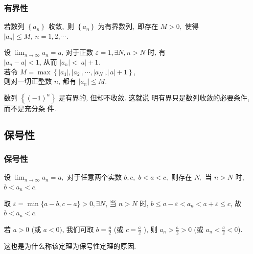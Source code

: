 \documentclass[mathserif]{beamer}
\begin{document}
\begin{frame}
\frametitle{有界性}
	\begin{thm}
		\suojin 若数列 $\left\{a_n\right\}$ 收敛,\ 则 $\left\{a_n\right\}$ 为有界数列,\ 即存在 $M>0$,\ 使得 $\left|a_n\right| \leq M,\ n=1,2, \cdots$.
		\end{thm}
	\pause 
	\begin{proofs}
		\suojin 设 $\lim _{n \rightarrow \infty} a_n=a$, 对于正数 $\varepsilon=1, \exists N, n>N$ 时, 有\\ $\left|a_n-a\right|<1$, 从而 $|a_n|<|a|+1$.\\
	\suojin 若令 $M=\max \left\{\left|a_1\right|,\left|a_2\right|, \cdots,\left|a_N\right|,|a|+1\right\}$,\\
	则对一切正整数 $n$, 都有 $\left|a_n\right| \leq M$.
    \end{proofs}
    \pause 
	\begin{alertblock}{}
			\suojin {} 数列 $\left\{(-1)^n\right\}$ 是有界的, 但却不收敛. 这就说 明有界只是数列收敛的必要条件, 而不是充分条 件.
		\end{alertblock}
\end{frame}




\subsection{保号性}

\begin{frame}
\frametitle{保号性}
	\begin{thm}
		\suojin 设 $\lim _{n \rightarrow \infty} a_n=a$,\ 对于任意两个实数 $b, c$,\ $b<a<c$,\ 则存在 $N$,\ 当 $n>N$ 时,\ $b<a_n<c$.
		\end{thm}
	\pause 
   \begin{proofs}
	\suojin 取 $\varepsilon=\min \{a-b, c-a\}>0, \exists N$, 当 $n>N$ 时, $b \leq a-\varepsilon<a_n<a+\varepsilon \leq c$, 故 $b<a_n<c$. 
    \end{proofs}
    \pause 
	\begin{alertblock}{}
		\suojin {} 若 $a>0$ (或 $a<0)$, 我们可取 $b=\frac{a}{2}$ (或 $c=\frac{a}{2}$ ), 则 $a_n>\frac{a}{2}>0$ (或 $a_n<\frac{a}{2}<0$).
	\end{alertblock}
	这也是为什么称该定理为保号性定理的原因.  
\end{frame}
\end{document}
